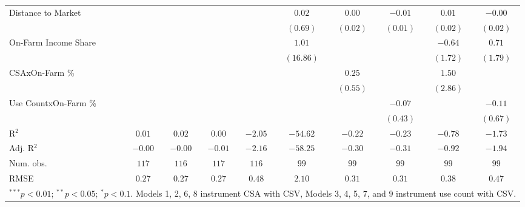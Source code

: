 \documentclass[
]{article}
\begin{document}
\begin{table}
\begin{center}
\begin{tabular}{l c c c c c c c c c}
Distance to Market   &                       &                      &          &           & $0.02$    & $0.00$   & $-0.01$  & $0.01$   & $-0.00$  \\
                     &                       &                      &          &           & $(0.69)$  & $(0.02)$ & $(0.01)$ & $(0.02)$ & $(0.02)$ \\
On-Farm Income Share &                       &                      &          &           & $1.01$    &          &          & $-0.64$  & $0.71$   \\
                     &                       &                      &          &           & $(16.86)$ &          &          & $(1.72)$ & $(1.79)$ \\
CSAxOn-Farm \%       &                       &                      &          &           &           & $0.25$   &          & $1.50$   &          \\
                     &                       &                      &          &           &           & $(0.55)$ &          & $(2.86)$ &          \\
Use CountxOn-Farm \% &                       &                      &          &           &           &          & $-0.07$  &          & $-0.11$  \\
                     &                       &                      &          &           &           &          & $(0.43)$ &          & $(0.67)$ \\
\hline
R$^2$                & $0.01$                & $0.02$               & $0.00$   & $-2.05$   & $-54.62$  & $-0.22$  & $-0.23$  & $-0.78$  & $-1.73$  \\
Adj. R$^2$           & $-0.00$               & $-0.00$              & $-0.01$  & $-2.16$   & $-58.25$  & $-0.30$  & $-0.31$  & $-0.92$  & $-1.94$  \\
Num. obs.            & $117$                 & $116$                & $117$    & $116$     & $99$      & $99$     & $99$     & $99$     & $99$     \\
RMSE                 & $0.27$                & $0.27$               & $0.27$   & $0.48$    & $2.10$    & $0.31$   & $0.31$   & $0.38$   & $0.47$   \\
\hline
\multicolumn{10}{l}{\scriptsize{$^{***}p<0.01$; $^{**}p<0.05$; $^{*}p<0.1$. Models 1, 2, 6, 8 instrument CSA with CSV, Models 3, 4, 5, 7, and 9 instrument use count with CSV.}}
\end{tabular}
\label{table:coefficients}
\end{center}
\end{table}
\end{document}
